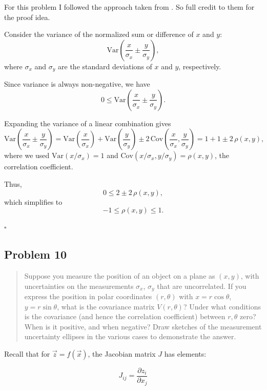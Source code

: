 \documentclass[10pt]{article}
\begin{document}
\divider

For this problem I followed the approach taken from \cite{statproofbook2023corr}. So full credit to them for the proof idea.

Consider the variance of the normalized sum or difference of $x$ and $y$:
\[
	\mathrm{Var}\!\left(\frac{x}{\sigma_x} \pm \frac{y}{\sigma_y}\right),
\]
where $\sigma_x$ and $\sigma_y$ are the standard deviations of $x$ and $y$, respectively.

Since variance is always non-negative, we have
\[
	0 \le \mathrm{Var}\!\left(\frac{x}{\sigma_x} \pm \frac{y}{\sigma_y}\right).
\]

Expanding the variance of a linear combination gives
\[
	\mathrm{Var}\!\left(\frac{x}{\sigma_x} \pm \frac{y}{\sigma_y}\right)
	= \mathrm{Var}\!\left(\frac{x}{\sigma_x}\right) + \mathrm{Var}\!\left(\frac{y}{\sigma_y}\right) \pm 2\,\mathrm{Cov}\!\left(\frac{x}{\sigma_x}, \frac{y}{\sigma_y}\right)
	= 1 + 1 \pm 2\,\rho(x,y),
\]
where we used $\mathrm{Var}(x/\sigma_x) = 1$ and $\mathrm{Cov}(x/\sigma_x, y/\sigma_y) = \rho(x,y)$, the correlation coefficient.

Thus,
\[
	0 \le 2 \pm 2 \,\rho(x,y),
\]
which simplifies to
\[
	-1 \le \rho(x,y) \le 1.
\]

\hfill $\square$







\subsection*{Problem 10}
\begin{quote}
	Suppose you measure the position of an object on a plane as $(x,y)$, with uncertainties on the measurements $\sigma_x$, $\sigma_y$ that are uncorrelated. If you express the position in polar coordinates $(r,\theta)$ with $x=r\cos\theta$, $y=r\sin\theta$, what is the covariance matrix $V(r,\theta)$? Under what conditions is the covariance (and hence the correlation coefficient) between $r,\theta$ zero? When is it positive, and when negative? Draw sketches of the measurement uncertainty ellipses in the various cases to demonstrate the answer.
\end{quote}

\divider

Recall that for $\vec{z} = f(\vec{x})$, the Jacobian matrix $J$ has elements:

\[ J_{ij} = \frac{\partial z_i}{\partial x_j} \]
\end{document}
